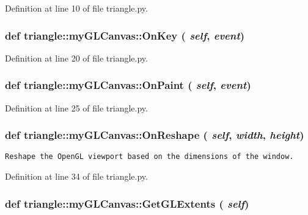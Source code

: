 Definition at line 10 of file triangle.py.
\subsubsection{\setlength{\rightskip}{0pt plus 5cm}def triangle::myGLCanvas::OnKey ( {\em self},  {\em event})}\label{classtriangle_1_1myGLCanvas_7cf31cba609ebee5bff99eef5a01e127}




Definition at line 20 of file triangle.py.
\subsubsection{\setlength{\rightskip}{0pt plus 5cm}def triangle::myGLCanvas::OnPaint ( {\em self},  {\em event})}\label{classtriangle_1_1myGLCanvas_465cf81be7398539bf1101f7e45b3a7a}




Definition at line 25 of file triangle.py.
\subsubsection{\setlength{\rightskip}{0pt plus 5cm}def triangle::myGLCanvas::OnReshape ( {\em self},  {\em width},  {\em height})}\label{classtriangle_1_1myGLCanvas_4bbbb82d320489637f8789bfba54f8f3}




\footnotesize\begin{verbatim}Reshape the OpenGL viewport based on the dimensions of the window.\end{verbatim}
\normalsize
 

Definition at line 34 of file triangle.py.
\subsubsection{\setlength{\rightskip}{0pt plus 5cm}def triangle::myGLCanvas::GetGLExtents ( {\em self})}\label{classtriangle_1_1myGLCanvas_a24bddfc0c07bc72a62b9d10bb724b2f}




